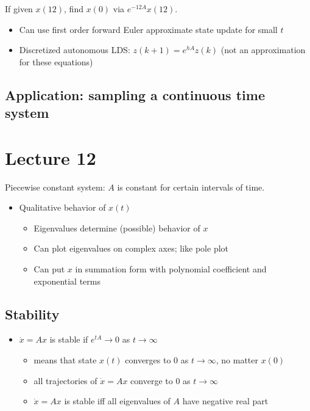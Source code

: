 \documentclass[10pt,letterpaper]{article}
\begin{document}
If given $x(12)$, find $x(0)$ via $e ^{-12A} x(12)$.
\begin{itemize}
\item Can use first order forward Euler approximate state update for small $t$
\item Discretized autonomous LDS: $z(k+1) = e ^{hA} z(k)$ (not an approximation for these equations)
\end{itemize}
\subsection{Application: sampling a continuous time system}
\label{sec-9_8}
\section{Lecture 12}
\label{sec-10}

Piecewise constant system: $A$ is constant for certain intervals of time.
\begin{itemize}
\item Qualitative behavior of $x(t)$

\begin{itemize}
\item Eigenvalues determine (possible) behavior of $x$
\item Can plot eigenvalues on complex axes; like pole plot
\item Can put $x$ in summation form with polynomial coefficient and exponential terms
\end{itemize}

\end{itemize}
\subsection{Stability}
\label{sec-10_1}

\begin{itemize}
\item $\dot x=Ax$ is stable if $e ^{tA} \rightarrow 0$ as $t \rightarrow \infty$

\begin{itemize}
\item means that state $x(t)$ converges to 0 as $t \rightarrow \infty$, no matter $x(0)$
\item all trajectories of $\dot x = Ax$ converge to 0 as $t \rightarrow \infty$
\item $\dot x=Ax$ is stable iff all eigenvalues of $A$ have negative real part
\end{itemize}

\end{itemize}
\end{document}
